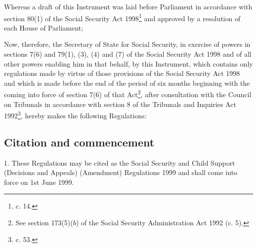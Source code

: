 \documentclass[12pt,a4paper]{article}
\title{\regstitle}
\author{S.I. 1999 No. 1466}
\date{Made 24th May 1999\\Coming into force 1st June 1999}
\begin{document}
\maketitle

\noindent
Whereas a draft of this Instrument was laid before Parliament in accordance with section 80(1) of the Social Security Act 1998\footnote{ c. 14.} and approved by a resolution of each House of Parliament;

Now, therefore, the Secretary of State for Social Security, in exercise of powers in sections 7(6) and 79(1), (3), (4) and (7) of the Social Security Act 1998 and of all other powers enabling him in that behalf, by this Instrument, which contains only regulations made by virtue of those provisions of the Social Security Act 1998 and which is made before the end of the period of six months beginning with the coming into force of section 7(6) of that Act\footnote{\frenchspacing See section 173(5)($b$) of the Social Security Administration Act 1992 (c. 5).}, after consultation with the Council on Tribunals in accordance with section 8 of the Tribunals and Inquiries Act 1992\footnote{ c. 53.}, hereby makes the following Regulations: 

{\sloppy

\tableofcontents

}

\bigskip

\setcounter{secnumdepth}{-2}

\subsection[1. Citation and commencement]{Citation and commencement}

1.  These Regulations may be cited as the Social Security and Child Support (Decisions and Appeals) (Amendment) Regulations 1999 and shall come into force on 1st June 1999.

\end{document}
